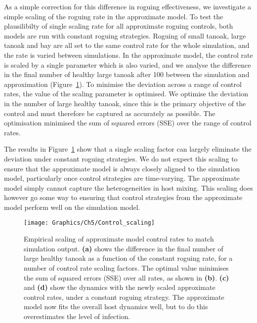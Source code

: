 
As a simple correction for this difference in roguing effectiveness, we investigate a simple scaling of the roguing rate in the approximate model. To test the plausilibilty of single scaling rate for all approximate roguing controls, both models are run with constant roguing strategies. Roguing of small tanoak, large tanoak and bay are all set to the same control rate for the whole simulation, and the rate is varied between simulations. In the approximate model, the control rate is scaled by a single parameter which is also varied, and we analyse the difference in the final number of healthy large tanoak after \SI{100}{\years} between the simulation and approximation (Figure~\ref{fig:ch5:control_scaling}). To minimise the deviation across a range of control rates, the value of the scaling parameter is optimised. We optimise the deviation in the number of large healthy tanoak, since this is the primary objective of the control and must therefore be captured as accurately as possible. The optimisation minimised the sum of squared errors (SSE) over the range of control rates.

The results in Figure~\ref{fig:ch5:control_scaling} show that a single scaling factor can largely eliminate the deviation under constant roguing strategies. We do not expect this scaling to ensure that the approximate model is always closely aligned to the simulation model, particularly once control strategies are time-varying. The approximate model simply cannot capture the heterogeneities in host mixing. This scaling does however go some way to ensuring that control strategies from the approximate model perform well on the simulation model.

\begin{figure}[h]
    \begin{center}
        \texttt{[image: Graphics/Ch5/Control\_scaling]}
        \caption[Scaling of control rates]{Empirical scaling of approximate model control rates to match simulation output. \textbf{(a)} shows the difference in the final number of large healthy tanoak as a function of the constant roguing rate, for a number of control rate scaling factors. The optimal value minimises the sum of squared errors (SSE) over all rates, as shown in \textbf{(b)}. \textbf{(c)} and \textbf{(d)} show the dynamics with the newly scaled approximate control rates, under a constant roguing strategy. The approximate model now fits the overall host dynamics well, but to do this overestimates the level of infection.\label{fig:ch5:control_scaling}}
    \end{center}
\end{figure}

